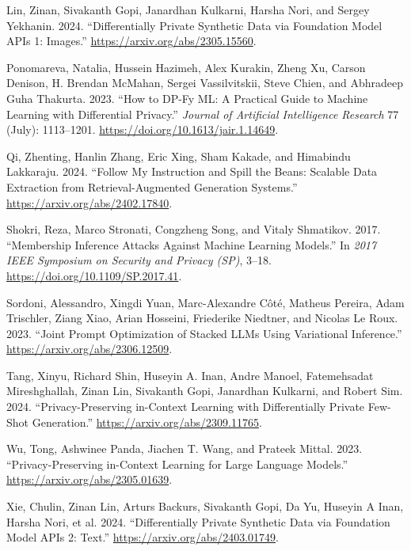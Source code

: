 \documentclass[
  12pt,
  a4paper,
]{article}
\newlength{\cslhangindent}
\newenvironment{CSLReferences}[2] %
 {\begin{list}{}{%
  \setlength{\itemindent}{0pt}
  \setlength{\leftmargin}{0pt}
  \setlength{\parsep}{0pt}
  \ifodd #1
   \setlength{\leftmargin}{\cslhangindent}
   \setlength{\itemindent}{-1\cslhangindent}
  \fi
  \setlength{\itemsep}{#2\baselineskip}}}
 {\end{list}}
\begin{document}
\begin{CSLReferences}{1}{0}
Lin, Zinan, Sivakanth Gopi, Janardhan Kulkarni, Harsha Nori, and Sergey
Yekhanin. 2024. {``Differentially Private Synthetic Data via Foundation
Model APIs 1: Images.''} \url{https://arxiv.org/abs/2305.15560}.

Ponomareva, Natalia, Hussein Hazimeh, Alex Kurakin, Zheng Xu, Carson
Denison, H. Brendan McMahan, Sergei Vassilvitskii, Steve Chien, and
Abhradeep Guha Thakurta. 2023. {``How to DP-Fy ML: A Practical Guide to
Machine Learning with Differential Privacy.''} \emph{Journal of
Artificial Intelligence Research} 77 (July): 1113--1201.
\url{https://doi.org/10.1613/jair.1.14649}.

Qi, Zhenting, Hanlin Zhang, Eric Xing, Sham Kakade, and Himabindu
Lakkaraju. 2024. {``Follow My Instruction and Spill the Beans: Scalable
Data Extraction from Retrieval-Augmented Generation Systems.''}
\url{https://arxiv.org/abs/2402.17840}.

Shokri, Reza, Marco Stronati, Congzheng Song, and Vitaly Shmatikov.
2017. {``Membership Inference Attacks Against Machine Learning
Models.''} In \emph{2017 IEEE Symposium on Security and Privacy (SP)},
3--18. \url{https://doi.org/10.1109/SP.2017.41}.

Sordoni, Alessandro, Xingdi Yuan, Marc-Alexandre Côté, Matheus Pereira,
Adam Trischler, Ziang Xiao, Arian Hosseini, Friederike Niedtner, and
Nicolas Le Roux. 2023. {``Joint Prompt Optimization of Stacked LLMs
Using Variational Inference.''} \url{https://arxiv.org/abs/2306.12509}.

Tang, Xinyu, Richard Shin, Huseyin A. Inan, Andre Manoel, Fatemehsadat
Mireshghallah, Zinan Lin, Sivakanth Gopi, Janardhan Kulkarni, and Robert
Sim. 2024. {``Privacy-Preserving in-Context Learning with Differentially
Private Few-Shot Generation.''} \url{https://arxiv.org/abs/2309.11765}.

Wu, Tong, Ashwinee Panda, Jiachen T. Wang, and Prateek Mittal. 2023.
{``Privacy-Preserving in-Context Learning for Large Language Models.''}
\url{https://arxiv.org/abs/2305.01639}.

Xie, Chulin, Zinan Lin, Arturs Backurs, Sivakanth Gopi, Da Yu, Huseyin A
Inan, Harsha Nori, et al. 2024. {``Differentially Private Synthetic Data
via Foundation Model APIs 2: Text.''}
\url{https://arxiv.org/abs/2403.01749}.


\end{CSLReferences}
\end{document}
